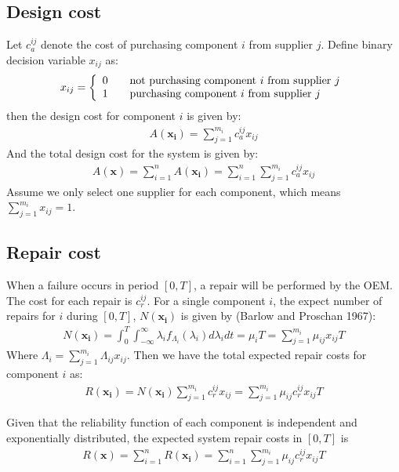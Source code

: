 \documentclass[preprint,12pt]{elsarticle}
\begin{document}
\subsection{Design cost}
	
	Let $c^{ij}_{a}$ denote the cost of purchasing component $i$ from supplier $j$. Define binary decision variable $x_{ij}$ as:
	\[ x_{ij} = \left \{
	  \begin{array} {l l}
		0 & \quad \text {not purchasing component $i$ from supplier $j$} \\
		1 & \quad \text {purchasing component $i$ from supplier $j$}
		\end {array} \right.\]
		then the design cost for component $i$ is given by:
	 \begin{eqnarray}
	A(\boldsymbol{x_{i}})=\sum^{m_{i}}_{j=1} {c^{ij}_{a} x_{ij}}
		 \end{eqnarray}
And the total design cost for the system is given by:
\begin{eqnarray}
	A(\boldsymbol{x})=\sum ^{n}_{i=1}A(\boldsymbol{x_{i}})=\sum ^{n}_{i=1}\sum^{m_{i}}_{j=1} {c^{ij}_{a} x_{ij}}
\end{eqnarray}
Assume we only select one supplier for each component, which means $\sum^{m_{i}}_{j=1}{x_{ij}=1}$.	
	
	\subsection{Repair cost}
	
When a failure occurs in period $[0, T]$, a repair will be performed by the OEM. The cost for each repair is $c_r^{ij}$. For a single component $i$, the expect number of repairs for $i$ during $[0,T]$, $N(\boldsymbol{x_{i}})$ is given by (Barlow and Proschan 1967):
\begin {eqnarray}
N(\boldsymbol{x_{i}})=\int_0^{T}\int_{-\infty}^{\infty}{{\lambda}_{i}f_{\Lambda_{i}}({\lambda}_{i})d{\lambda}_{i}dt}=\mu_{i}T=\sum_{j=1}^{m_{i}}{\mu_{ij}x_{ij}}T
\end {eqnarray}
Where $\Lambda_{i}=\sum_{j=1}^{m_{i}}{\Lambda}_{ij}x_{ij}$. Then we have the total expected repair costs for component $i$ as:
\begin {eqnarray}
R(\boldsymbol{x_{i}})=N(\boldsymbol{x_{i}})\sum_{j=1}^{m_{i}}{c_r^{ij}x_{ij}}=\sum_{j=1}^{m_{i}}{\mu_{ij}c_r^{ij}x_{ij}}T
\end {eqnarray}

Given that the reliability function of each component is independent and exponentially distributed, the expected system repair costs in $[0,T]$ is
\begin {eqnarray}
R(\boldsymbol{x})=\sum_{i=1}^{n}R(\boldsymbol{x_{i}})=\sum_{i=1}^{n}\sum_{j=1}^{m_{i}}{\mu_{ij}c_r^{ij}x_{ij}}T
\end {eqnarray}
\end{document}
